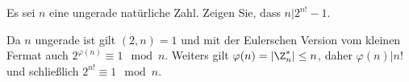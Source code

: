 
\begin{exercise}

Es sei $n$ eine ungerade natürliche Zahl. Zeigen Sie, dass $n|2^{n!} - 1$.

\end{exercise}


\begin{solution}
Da $n$ ungerade ist gilt $(2,n) = 1$ und mit der Eulerschen Version 
vom kleinen Fermat auch $2^{\varphi(n)} \equiv 1 \mod{n}$.
Weiters gilt $\varphi(n) = |\Z_n^*| \leq n$, daher $\varphi(n) | n!$
und schließlich $2^{n!} \equiv 1 \mod{n}$.

\end{solution}

